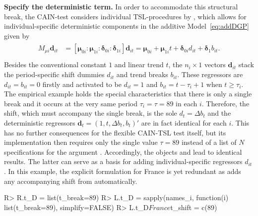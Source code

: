 \textbf{Specify the deterministic term.} In order to accommodate this structural break, the CAIN-test considers individual TSL-procedures by \citet{TrenklerEtAl2008}, which allows for individual-specific deterministic components in the additive Model~\eqref{eq:addDGP} given by
\begin{align} \label{eq:detTerm}
\begin{split}
	M_{\mu i} \boldsymbol{d}_{it} & = \left[ \boldsymbol{\mu}_{0i} : \boldsymbol{\mu}_{1i} : \boldsymbol{\delta}_{0i} : \boldsymbol{\delta}_{1i} \right] \boldsymbol{d}_{it}	= \boldsymbol{\mu}_{0i} + \boldsymbol{\mu}_{1i}t + \boldsymbol{\delta}_{0i} d_{it} + \boldsymbol{\delta}_1 b_{it}. \\
\end{split}
\end{align}
Besides the conventional constant $ 1 $ and linear trend $ t $, the $ n_i \times 1 $ vectors $ \boldsymbol{d}_{it} $ stack the period-specific shift dummies $ d_{it} $ and trend breaks $ b_{it} $. These regressors are $ d_{it} = b_{it} = 0 $ firstly and activated to be  $ d_{it} = 1 $ and  $ b_{it} = t -\tau_i +1 $ when $ t \geq \tau_i $. The empirical example holds the special characteristics that there is only a single break and it occurs at the very same period $ \tau_i = \tau = 89 $ in each $ i $. Therefore, the shift, which must accompany the single break, is the sole $ d_{t} = \Delta b_t $ and the deterministic regressors $ \boldsymbol{d}_{t} = \left( 1, t, \Delta b_t, b_t \right)' $ are in fact identical for each $ i $. This has no further consequences for the flexible CAIN-TSL test itself, but its implementation  then requires only the single value $ \tau=89 $ instead of a list of $ N $ specifications for the argument . Accordingly, the objects  and  lead to identical results. The latter can serve as a basis for adding individual-specific regressors $ d_{it} $. In this example, the explicit formulation for France is yet redundant as  adds any accompanying shift from  automatically.
\begin{CodeChunk}
\begin{CodeInput}
R> R.t_D = list(t_break=89)
R> L.t_D = sapply(names_i, function(i) list(t_break=89), simplify=FALSE)
R> L.t_D$France$t_shift = c(89)
\end{CodeInput}
\end{CodeChunk}


